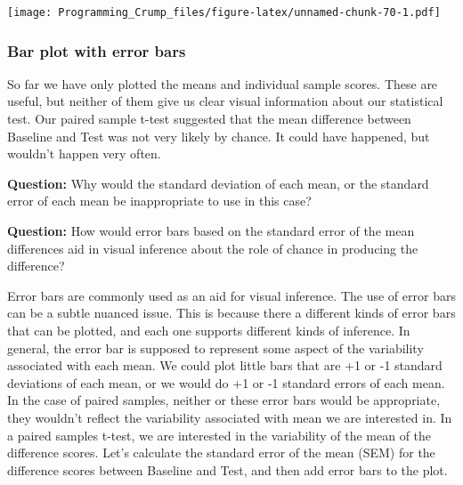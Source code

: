 \documentclass[]{book}
\theoremstyle{definition}
\theoremstyle{definition}
\theoremstyle{definition}
\theoremstyle{remark}
\begin{document}
\texttt{[image: Programming\_Crump\_files/figure-latex/unnamed-chunk-70-1.pdf]}

\subsubsection{Bar plot with error bars}\label{bar-plot-with-error-bars}

So far we have only plotted the means and individual sample scores.
These are useful, but neither of them give us clear visual information
about our statistical test. Our paired sample t-test suggested that the
mean difference between Baseline and Test was not very likely by chance.
It could have happened, but wouldn't happen very often.

\textbf{Question:} Why would the standard deviation of each mean, or the
standard error of each mean be inappropriate to use in this case?

\textbf{Question:} How would error bars based on the standard error of
the mean differences aid in visual inference about the role of chance in
producing the difference?

Error bars are commonly used as an aid for visual inference. The use of
error bars can be a subtle nuanced issue. This is because there a
different kinds of error bars that can be plotted, and each one supports
different kinds of inference. In general, the error bar is supposed to
represent some aspect of the variability associated with each mean. We
could plot little bars that are +1 or -1 standard deviations of each
mean, or we would do +1 or -1 standard errors of each mean. In the case
of paired samples, neither or these error bars would be appropriate,
they wouldn't reflect the variability associated with mean we are
interested in. In a paired samples t-test, we are interested in the
variability of the mean of the difference scores. Let's calculate the
standard error of the mean (SEM) for the difference scores between
Baseline and Test, and then add error bars to the plot.
\end{document}

